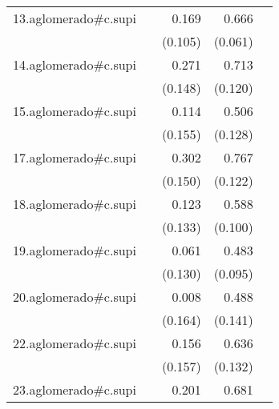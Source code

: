 {\begin{longtable}{l*{4}{D{.}{.}{-1}}}
\addlinespace
13.aglomerado#c.supi&                     &       0.169         &       0.666\sym{***}&                     \\
            &                     &     (0.105)         &     (0.061)         &                     \\
\addlinespace
14.aglomerado#c.supi&                     &       0.271         &       0.713\sym{***}&                     \\
            &                     &     (0.148)         &     (0.120)         &                     \\
\addlinespace
15.aglomerado#c.supi&                     &       0.114         &       0.506\sym{***}&                     \\
            &                     &     (0.155)         &     (0.128)         &                     \\
\addlinespace
17.aglomerado#c.supi&                     &       0.302\sym{*}  &       0.767\sym{***}&                     \\
            &                     &     (0.150)         &     (0.122)         &                     \\
\addlinespace
18.aglomerado#c.supi&                     &       0.123         &       0.588\sym{***}&                     \\
            &                     &     (0.133)         &     (0.100)         &                     \\
\addlinespace
19.aglomerado#c.supi&                     &       0.061         &       0.483\sym{***}&                     \\
            &                     &     (0.130)         &     (0.095)         &                     \\
\addlinespace
20.aglomerado#c.supi&                     &       0.008         &       0.488\sym{***}&                     \\
            &                     &     (0.164)         &     (0.141)         &                     \\
\addlinespace
22.aglomerado#c.supi&                     &       0.156         &       0.636\sym{***}&                     \\
            &                     &     (0.157)         &     (0.132)         &                     \\
\addlinespace
23.aglomerado#c.supi&                     &       0.201         &       0.681\sym{***}&                     \\

\end{longtable}}
